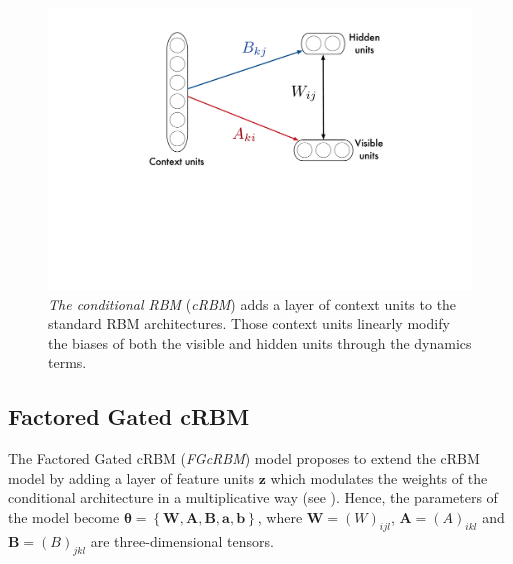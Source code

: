 \documentclass[letterpaper]{article}
\begin{document}
\begin{figure}[ht]
\centering
\includegraphics[scale=0.26]{cRBM_orchestration}
\caption{\textit{The conditional RBM} (\textit{cRBM}) adds a layer of context units to the standard RBM architectures. Those context units linearly modify the biases of both the visible and hidden units through the dynamics terms.}
\label{fig:cRBM_orchestration}
\end{figure}

\subsection{Factored Gated cRBM}
The Factored Gated cRBM (\textit{FGcRBM}) model  \cite{taylor2009factored} proposes to extend the cRBM model by adding a layer of feature units $\bm{z}$ which modulates the weights of the conditional architecture in a multiplicative way (see ). Hence, the parameters of the model become $\bm{\theta} = \left\lbrace \bm{W} , \bm{A} , \bm{B} , \bm{a} , \bm{b} \right\rbrace$, where $\bm{W} = (W)_{ijl}$, $\bm{A}=(A)_{ikl}$ and $\bm{B}=(B)_{jkl}$ are three-dimensional tensors.
\end{document}
